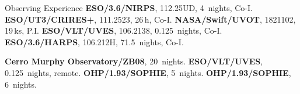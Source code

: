 \begin{rubric}{Observing Experience}
\entry*[2023]
    \textbf{ESO/3.6/NIRPS}, 112.25UD, 4~nights, Co-I.
\entry*[2023]
    \textbf{ESO/UT3/CRIRES+}, 111.2523, 26\,h, Co-I.
\entry*[2022]
    \textbf{NASA/Swift/UVOT}, 1821102, 19\,ks, P.I.
\entry*[2020]
    \textbf{ESO/VLT/UVES}, 106.2138, 0.125~nights, Co-I.
\entry*[2020]
    \textbf{ESO/3.6/HARPS}, 106.212H, 71.5~nights, Co-I.

\entry*[2024]
    \textbf{Cerro Murphy Observatory/ZB08}, 20~nights.
\entry*[2020]
    \textbf{ESO/VLT/UVES}, 0.125~nights, remote.
\entry*[2020]
    \textbf{OHP/1.93/SOPHIE}, 5~nights.
\entry*[2019]
    \textbf{OHP/1.93/SOPHIE}, 6~nights.
\end{rubric}